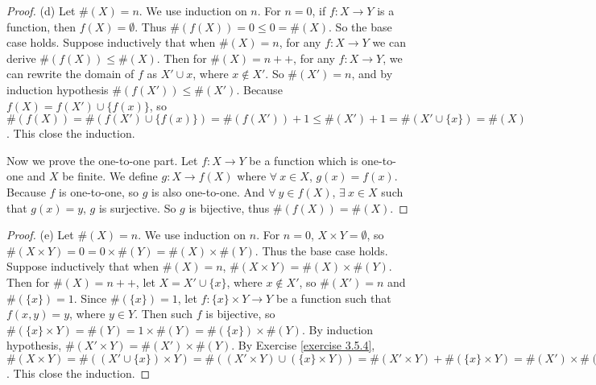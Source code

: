 \begin{proof}{(d)}
Let \(\#(X) = n\).
We use induction on \(n\).
For \(n = 0\), if \(f : X \to Y\) is a function, then \(f(X) = \emptyset\).
Thus \(\#(f(X)) = 0 \leq 0 = \#(X)\).
So the base case holds.
Suppose inductively that when \(\#(X) = n\), for any \(f : X \to Y\) we can derive \(\#(f(X)) \leq \#(X)\).
Then for \(\#(X) = n++\), for any \(f : X \to Y\), we can rewrite the domain of \(f\) as \(X' \cup x\), where \(x \notin X'\).
So \(\#(X') = n\), and by induction hypothesis \(\#(f(X')) \leq \#(X')\).
Because \(f(X) = f(X') \cup \{f(x)\}\), so \(\#(f(X)) = \#(f(X') \cup \{f(x)\}) = \#(f(X')) + 1 \leq \#(X') + 1 = \#(X' \cup \{x\}) = \#(X)\).
This close the induction.

Now we prove the one-to-one part.
Let \(f : X \to Y\) be a function which is one-to-one and \(X\) be finite.
We define \(g : X \to f(X)\) where \(\forall\ x \in X\), \(g(x) = f(x)\).
Because \(f\) is one-to-one, so \(g\) is also one-to-one.
And \(\forall\ y \in f(X)\), \(\exists\ x \in X\) such that \(g(x) = y\), \(g\) is surjective.
So \(g\) is bijective, thus \(\#(f(X)) = \#(X)\).
\end{proof}

\begin{proof}{(e)}
Let \(\#(X) = n\).
We use induction on \(n\).
For \(n = 0\), \(X \times Y = \emptyset\), so \(\#(X \times Y) = 0 = 0 \times \#(Y) = \#(X) \times \#(Y)\).
Thus the base case holds.
Suppose inductively that when \(\#(X) = n\), \(\#(X \times Y) = \#(X) \times \#(Y)\).
Then for \(\#(X) = n++\), let \(X = X' \cup \{x\}\), where \(x \notin X'\), so \(\#(X') = n\) and \(\#(\{x\}) = 1\).
Since \(\#(\{x\}) = 1\), let \(f : \{x\} \times Y \to Y\) be a function such that \(f(x, y) = y\), where \(y \in Y\).
Then such \(f\) is bijective, so \(\#(\{x\} \times Y) = \#(Y) = 1 \times \#(Y) = \#(\{x\}) \times \#(Y)\).
By induction hypothesis, \(\#(X' \times Y) = \#(X') \times \#(Y)\).
By Exercise \ref{exercise 3.5.4}, \(\#(X \times Y) = \#((X' \cup \{x\}) \times Y) = \#((X' \times Y) \cup (\{x\} \times Y)) = \#(X' \times Y) + \#(\{x\} \times Y) = \#(X') \times \#(Y) + \#(\{x\}) \times \#(Y) = (\#(X') + \#(\{x\})) \times \#(Y) = \#(X) \times \#(Y)\).
This close the induction.
\end{proof}

